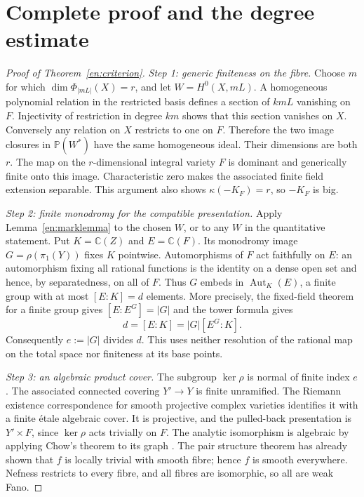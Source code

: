 \documentclass[12pt]{amsart}
\theoremstyle{definition}
\theoremstyle{remark}
\numberwithin{equation}{section}
\DeclareMathOperator{\Autop}{Aut}
\newcommand{\C}{\mathbb{C}}
\newcommand{\mP}{\mathbb{P}}
\begin{document}
\section{Complete proof and the degree estimate}\label{en:proof}
\begin{proof}[Proof of Theorem~\ref{en:criterion}]
\textit{Step 1: generic finiteness on the fibre.}
Choose $m$ for which $\dim\Phi_{|mL|}(X)=r$, and let $W=H^0(X,mL)$. A homogeneous polynomial relation in the restricted basis defines a section of $kmL$ vanishing on $F$. Injectivity of restriction in degree $km$ shows that this section vanishes on $X$. Conversely any relation on $X$ restricts to one on $F$. Therefore the two image closures in $\mP(W^*)$ have the same homogeneous ideal. Their dimensions are both $r$. The map on the $r$-dimensional integral variety $F$ is dominant and generically finite onto this image. Characteristic zero makes the associated finite field extension separable. This argument also shows $\kappa(-K_F)=r$, so $-K_F$ is big.

\textit{Step 2: finite monodromy for the compatible presentation.}
Apply Lemma~\ref{en:marklemma} to the chosen $W$, or to any $W$ in the quantitative statement. Put $K=\C(Z)$ and $E=\C(F)$. Its monodromy image $G=\rho(\pi_1(Y))$ fixes $K$ pointwise. Automorphisms of $F$ act faithfully on $E$: an automorphism fixing all rational functions is the identity on a dense open set and hence, by separatedness, on all of $F$. Thus $G$ embeds in $\Autop_K(E)$, a finite group with at most $[E:K]=d$ elements. More precisely, the fixed-field theorem for a finite group \cite[Tag 09I3]{en:Stacks} gives $[E:E^G]=|G|$ and the tower formula gives
\[
 d=[E:K]=|G|[E^G:K].
\]
Consequently $e:=|G|$ divides $d$. This uses neither resolution of the rational map on the total space nor finiteness at its base points.

\textit{Step 3: an algebraic product cover.}
The subgroup $\ker\rho$ is normal of finite index $e$. The associated connected covering $Y'\to Y$ is finite unramified. The Riemann existence correspondence \cite[Expos\'e XII, Theorem 5.1]{en:SGA} for smooth projective complex varieties identifies it with a finite \'etale algebraic cover. It is projective, and the pulled-back presentation is $Y'\times F$, since $\ker\rho$ acts trivially on $F$. The analytic isomorphism is algebraic by applying Chow's theorem to its graph \cite[Section 4, Proposition 14]{en:Serre}. The pair structure theorem has already shown that $f$ is locally trivial with smooth fibre; hence $f$ is smooth everywhere. Nefness restricts to every fibre, and all fibres are isomorphic, so all are weak Fano.


\end{proof}
\end{document}
